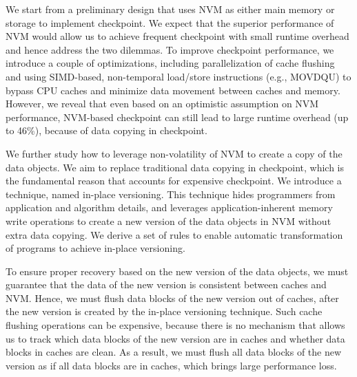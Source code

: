 We start from a preliminary design that uses NVM as either main memory or storage to implement checkpoint. We expect that the superior performance of NVM would allow us to achieve frequent checkpoint with small runtime overhead and hence address the two dilemmas. 
To improve checkpoint performance, we introduce 
a couple of optimizations, including parallelization of cache flushing and using 
SIMD-based, non-temporal load/store instructions (e.g.,
MOVDQU) to bypass CPU caches and minimize data movement between caches
and memory.
However, we reveal that even based on an optimistic assumption on NVM performance, NVM-based checkpoint can still lead to large runtime overhead (up to 46\%), because of data copying in checkpoint. 

We further study how to leverage non-volatility of NVM to create a copy
of the data objects. We aim to replace traditional data copying in checkpoint, which is the fundamental reason that accounts for expensive checkpoint. 
We introduce a technique, named in-place versioning.
This technique hides programmers from application and algorithm details, and leverages application-inherent memory write operations to create a new version of the data objects in NVM without extra data copying. We derive a set of rules to enable automatic transformation of programs to achieve in-place versioning. %

To ensure proper recovery based on the new version of the data objects, 
we must guarantee that the data of the new version is consistent between caches and NVM.
Hence, we must flush data blocks of the new version out of caches, after the new version is created by the in-place versioning technique.
Such cache flushing operations can be expensive, because there is
no mechanism that allows us to track which data blocks of the new version are in caches and whether data blocks in caches are clean. As a result, we must flush all data blocks of the new version as if all data blocks are in caches,
which brings large performance loss.

